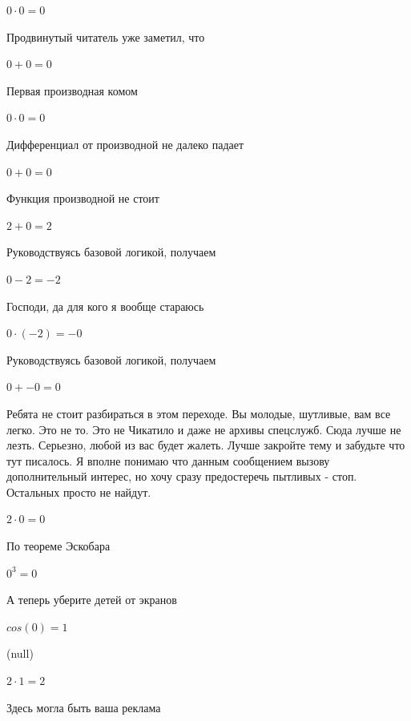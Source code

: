 \documentclass[12pt,a4paper,fleqn]{article}
\begin{document}
\begin{center}$0 \cdot 0 = 0$\end{center}
Продвинутый читатель уже заметил, что

\begin{center}$0+0 = 0$\end{center}
Первая производная комом\cite{link2}

\begin{center}$0 \cdot 0 = 0$\end{center}
Дифференциал от производной не далеко падает\cite{link2}

\begin{center}$0+0 = 0$\end{center}
Функция производной не стоит\cite{link2}

\begin{center}$2+0 = 2$\end{center}
Руководствуясь базовой логикой, получаем

\begin{center}$0-2 = -2$\end{center}
Господи, да для кого я вообще стараюсь

\begin{center}$0 \cdot (-2) = -0$\end{center}
Руководствуясь базовой логикой, получаем

\begin{center}$0+-0 = 0$\end{center}
Ребята не стоит разбираться в этом переходе. Вы молодые, шутливые, вам все легко. Это не то. Это не Чикатило и даже не архивы спецслужб. Сюда лучше не лезть. Серьезно, любой из вас будет жалеть. Лучше закройте тему и забудьте что тут писалось. Я вполне понимаю что данным сообщением вызову дополнительный интерес, но хочу сразу предостеречь пытливых - стоп. Остальных просто не найдут.

\begin{center}$2 \cdot 0 = 0$\end{center}
По теореме Эскобара

\begin{center}$0^{3} = 0$\end{center}
А теперь уберите детей от экранов

\begin{center}$cos(0) = 1$\end{center}
(null)\cite{link4}

\begin{center}$2 \cdot 1 = 2$\end{center}
Здесь могла быть ваша реклама
\end{document}
